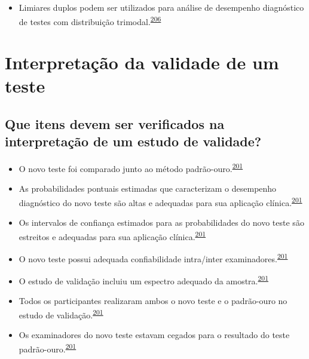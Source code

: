 \documentclass[
  a4paper,
]{book}
\providecommand{\tightlist}{%
  \setlength{\itemsep}{0pt}\setlength{\parskip}{0pt}}
\begin{document}
\begin{itemize}
\tightlist
\item
  Limiares duplos podem ser utilizados para análise de desempenho diagnóstico de testes com distribuição trimodal.\textsuperscript{\protect\hyperlink{ref-ferreira2021}{206}}
\end{itemize}

\hypertarget{interpretacao-desempenho}{%
\section{Interpretação da validade de um teste}\label{interpretacao-desempenho}}

\hypertarget{que-itens-devem-ser-verificados-na-interpretauxe7uxe3o-de-um-estudo-de-validade}{%
\subsection{Que itens devem ser verificados na interpretação de um estudo de validade?}\label{que-itens-devem-ser-verificados-na-interpretauxe7uxe3o-de-um-estudo-de-validade}}

\begin{itemize}
\item
  O novo teste foi comparado junto ao método padrão-ouro.\textsuperscript{\protect\hyperlink{ref-greenhalgh1997b}{201}}
\item
  As probabilidades pontuais estimadas que caracterizam o desempenho diagnóstico do novo teste são altas e adequadas para sua aplicação clínica.\textsuperscript{\protect\hyperlink{ref-greenhalgh1997b}{201}}
\item
  Os intervalos de confiança estimados para as probabilidades do novo teste são estreitos e adequadas para sua aplicação clínica.\textsuperscript{\protect\hyperlink{ref-greenhalgh1997b}{201}}
\item
  O novo teste possui adequada confiabilidade intra/inter examinadores.\textsuperscript{\protect\hyperlink{ref-greenhalgh1997b}{201}}
\item
  O estudo de validação incluiu um espectro adequado da amostra.\textsuperscript{\protect\hyperlink{ref-greenhalgh1997b}{201}}
\item
  Todos os participantes realizaram ambos o novo teste e o padrão-ouro no estudo de validação.\textsuperscript{\protect\hyperlink{ref-greenhalgh1997b}{201}}
\item
  Os examinadores do novo teste estavam cegados para o resultado do teste padrão-ouro.\textsuperscript{\protect\hyperlink{ref-greenhalgh1997b}{201}}
\end{itemize}
\end{document}
